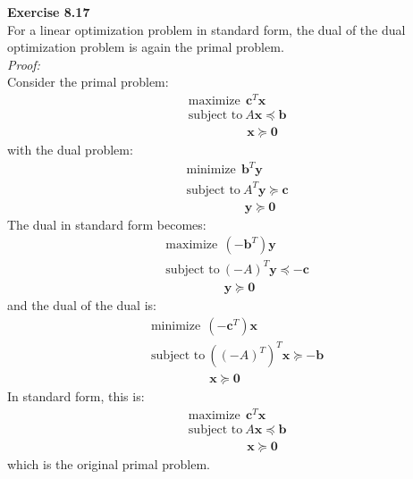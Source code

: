 \documentclass[letterpaper,12pt]{article}
\let\vec\mathbf
\theoremstyle{definition}
\begin{document}
\textbf{Exercise 8.17} \\
For a linear optimization problem in standard form, the dual of the dual optimization problem is again the primal problem. \\
\textit{Proof:} \\
Consider the primal problem:
\begin{align*}
  &\text{maximize} \ \ \vec{c}^T\vec{x} \\
  &\text{subject to} \ A\vec{x} \preceq \vec{b} \\
  &\qquad \qquad \ \ \ \vec{x} \succeq \vec{0}
\end{align*}
with the dual problem:
\begin{align*}
  &\text{minimize} \ \ \vec{b}^T\vec{y} \\
  &\text{subject to} \ A^T\vec{y} \succeq \vec{c} \\
  &\qquad \qquad \ \ \ \vec{y} \succeq \vec{0}
\end{align*}
The dual in standard form becomes:
\begin{align*}
  &\text{maximize} \ \ (-\vec{b}^T)\vec{y} \\
  &\text{subject to} \ (-A)^T\vec{y} \preceq -\vec{c} \\
  &\qquad \qquad \ \ \ \vec{y} \succeq \vec{0}
\end{align*}
and the dual of the dual is:
\begin{align*}
  &\text{minimize} \ \ (-\vec{c}^T)\vec{x} \\
  &\text{subject to} \ ((-A)^T)^T\vec{x} \succeq -\vec{b} \\
  &\qquad \qquad \ \ \ \vec{x} \succeq \vec{0}
\end{align*}
In standard form, this is:
\begin{align*}
  &\text{maximize} \ \ \vec{c}^T\vec{x} \\
  &\text{subject to} \ A\vec{x} \preceq \vec{b} \\
  &\qquad \qquad \ \ \ \vec{x} \succeq \vec{0}
\end{align*}
which is the original primal problem. \\
\end{document}
